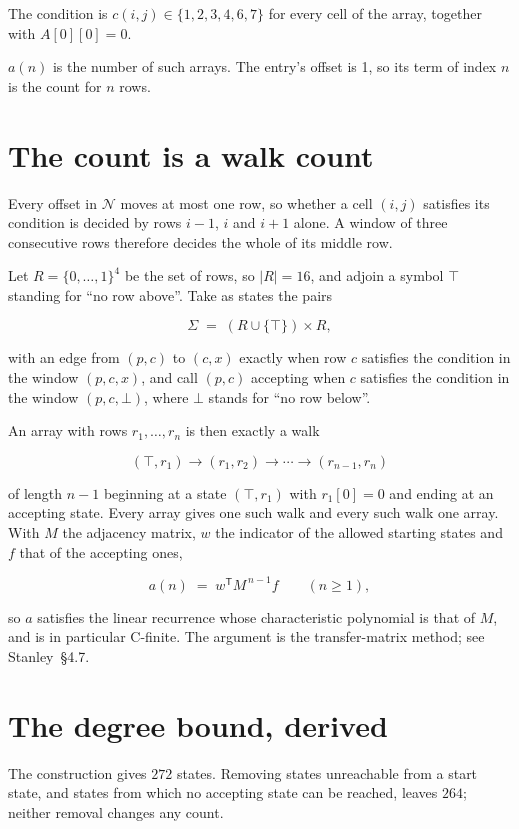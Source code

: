 \documentclass[11pt]{article}
\theoremstyle{definition}
\begin{document}
The condition is $c(i,j) \in \{1, 2, 3, 4, 6, 7\}$ for every cell of the array, together with $A[0][0]=0$.

$a(n)$ is the number of such arrays. The entry's offset is 1, so its term of index $n$ is the count for $n$ rows.

\section{The count is a walk count}

Every offset in $\mathcal{N}$ moves at most one row, so whether a cell $(i,j)$ satisfies its condition is decided by rows $i-1$, $i$ and $i+1$ alone. A window of three consecutive rows therefore decides the whole of its middle row.

Let $R = \{0,\dots,1\}^{4}$ be the set of rows, so $|R| = 16$, and adjoin a symbol $\top$ standing for ``no row above''. Take as states the pairs

\[\Sigma \;=\; (R \cup \{\top\}) \times R,\]

with an edge from $(p,c)$ to $(c,x)$ exactly when row $c$ satisfies the condition in the window $(p,c,x)$, and call $(p,c)$ accepting when $c$ satisfies the condition in the window $(p,c,\bot)$, where $\bot$ stands for ``no row below''.

An array with rows $r_1,\dots,r_n$ is then exactly a walk

\[(\top,r_1) \to (r_1,r_2) \to \cdots \to (r_{n-1},r_n)\]

of length $n-1$ beginning at a state $(\top,r_1)$ with $r_1[0]=0$ and ending at an accepting state. Every array gives one such walk and every such walk one array. With $M$ the adjacency matrix, $w$ the indicator of the allowed starting states and $f$ that of the accepting ones,

\[a(n) \;=\; w^{\mathsf T} M^{\,n-1} f \qquad (n \ge 1),\]

so $a$ satisfies the linear recurrence whose characteristic polynomial is that of $M$, and is in particular C-finite. The argument is the transfer-matrix method; see Stanley~\S4.7.

\section{The degree bound, derived}

The construction gives $272$ states. Removing states unreachable from a start state, and states from which no accepting state can be reached, leaves $264$; neither removal changes any count.
\end{document}
